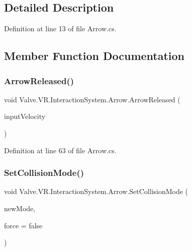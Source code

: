 \subsection{Detailed Description}


Definition at line 13 of file Arrow.\+cs.



\subsection{Member Function Documentation}
\mbox{\label{class_valve_1_1_v_r_1_1_interaction_system_1_1_arrow_a936f74ee01dcd577819cbdd19c9b5825}} 
\subsubsection{\texorpdfstring{ArrowReleased()}{ArrowReleased()}}
{\footnotesize\ttfamily void Valve.\+V\+R.\+Interaction\+System.\+Arrow.\+Arrow\+Released (\begin{DoxyParamCaption}\item[{float}]{input\+Velocity }\end{DoxyParamCaption})}



Definition at line 63 of file Arrow.\+cs.

\mbox{\label{class_valve_1_1_v_r_1_1_interaction_system_1_1_arrow_a202aba7427eea1165521de831008922f}} 
\subsubsection{\texorpdfstring{SetCollisionMode()}{SetCollisionMode()}}
{\footnotesize\ttfamily void Valve.\+V\+R.\+Interaction\+System.\+Arrow.\+Set\+Collision\+Mode (\begin{DoxyParamCaption}\item[{Collision\+Detection\+Mode}]{new\+Mode,  }\item[{bool}]{force = {\ttfamily false} }\end{DoxyParamCaption})\hspace{0.3cm}{\ttfamily [protected]}}



